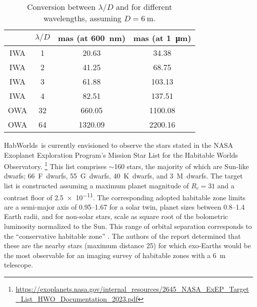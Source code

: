 \documentclass[
    usenatbib,
]{mnras}
\newcommand{\todo}[1]{\textcolor{red}{[#1]}}
\newcommand{\hwo}{HabWorlds}
\begin{document}
\begin{table}
    \centering
    \caption{
        Conversion between $\lambda / D$ and \si{\mas} for different wavelengths, assuming $D = \SI{6}{\meter}$. 
    }
    \label{tab:IWA_OWA}
    \begin{tabular}{ c c c c } 
    \toprule
     & $\lambda/D$ & mas (at \SI{600}{\nano\meter}) & mas (at \SI{1}{\micro\meter}) \\
    \midrule
    \midrule
    IWA & 1 & 20.63 & 34.38 \\
    IWA & 2 & 41.25 & 68.75 \\
    IWA & 3 & 61.88 & 103.13 \\
    IWA & 4 & 82.51 & 137.51 \\
    \midrule
    OWA & 32 &  660.05 & 1100.08 \\
    OWA & 64 & 1320.09 & 2200.16 \\
    \bottomrule
    \end{tabular}
\end{table}


\hwo\ is currently envisioned to observe the stars stated in the NASA Exoplanet Exploration Program's Mission Star List for the Habitable Worlds Observatory.
%
\footnote{\url{https://exoplanets.nasa.gov/internal_resources/2645_NASA_ExEP_Target_List_HWO_Documentation_2023.pdf}}
%
This list comprises $\sim$160 stars, the majority of which are Sun-like dwarfs; 66~F~dwarfs, 55~G~dwarfs, 40~K~dwarfs, and 3~M~dwarfs.
%
The target list is constructed assuming a maximum planet magnitude of $R_c = 31$ and a contrast floor of \num{2.5e-11}. 
The corresponding adopted habitable zone limits are a semi-major axis of \SIrange{0.95}{1.67}{\au} for a solar twin, planet sizes between \SIrange{0.8}{1.4}{} Earth radii, and for non-solar stars, scale as square root of the bolometric luminosity normalized to the Sun. 
%
This range of orbital separation corresponds to the \enquote{conservative habitable zone} \citep{kasting93, kopparapu13}. 
%
The authors of the report determined that these are the nearby stars (maximum distance \SI{25}{\parsec}) for which exo-Earths would be the most observable for an imaging survey of habitable zones with a \SI{6}{\meter} telescope. 
\end{document}
